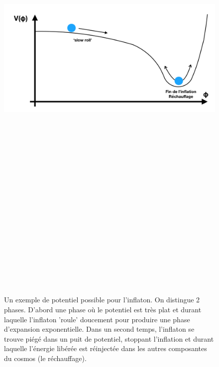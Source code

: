 \begin{figure}[htbp]
	\centering
		\includegraphics[height=25cm]{figs/slowroll.png}
	\caption{Un exemple de potentiel possible pour l'inflaton. On distingue 2 phases. D'abord une phase où le potentiel est très plat et durant laquelle l'inflaton 'roule' doucement pour produire une phase d'expansion exponentielle. Dans un second temps, l'inflaton se trouve piégé dans un puit de potentiel, stoppant l'inflation et durant laquelle l'énergie libérée est réinjectée dans les autres composantes du cosmos (le réchauffage).}
	\label{f:slowroll}
\end{figure}

